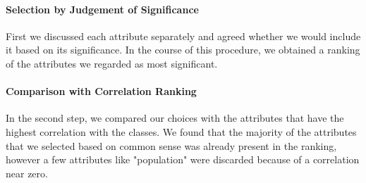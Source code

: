 \paragraph{Selection by Judgement of Significance}
First we discussed each attribute separately and agreed whether we
would include it based on its significance. In the course of this
procedure, we obtained a ranking of the attributes we regarded as most
significant.

\paragraph{Comparison with Correlation Ranking}
In the second step, we compared our choices with the attributes that
have the highest correlation with the classes. We found that the
majority of the attributes that we selected based on common sense was
already present in the ranking, however a few attributes like
"population" were discarded because of a correlation near zero.

